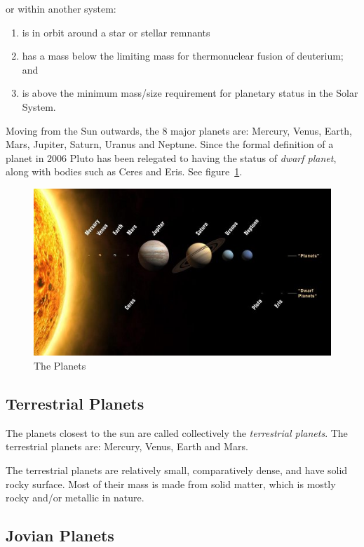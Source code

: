 or within another system:

\begin{enumerate}
\item
  is in orbit around a star or stellar remnants
\item
  has a mass below the limiting mass for thermonuclear fusion of
  deuterium; and
\item
  is above the minimum mass/size requirement for planetary status in the
  Solar System.
\end{enumerate}

Moving from the Sun outwards, the 8 major planets are: Mercury, Venus,
Earth, Mars, Jupiter, Saturn, Uranus and Neptune. Since the formal
definition of a planet in 2006 Pluto has been relegated to having the
status of \emph{dwarf planet}, along with bodies such as Ceres and Eris.
See figure~\ref{fig:planets}.

\begin{figure}[t]
  \centering
  \includegraphics[width=0.9\linewidth]{pictures/the_planets.jpg}
  \caption{The Planets}
  \label{fig:planets}
\end{figure}


\subsection{Terrestrial Planets}%

The planets closest to the sun are called collectively the
\emph{terrestrial planets}. The terrestrial planets are: Mercury, Venus,
Earth and Mars.

The terrestrial planets are relatively small, comparatively dense, and
have solid rocky surface. Most of their mass is made from solid matter,
which is mostly rocky and/or metallic in nature.

\subsection{Jovian Planets}%

